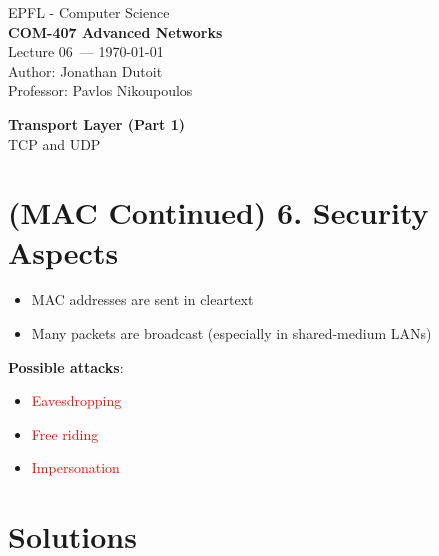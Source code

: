 \documentclass[11pt]{article}
\newcommand{\coursename}{COM-407 Advanced Networks}
\newcommand{\lecturenum}{06}
\newcommand{\lecturedate}{\today}
\newcommand{\professor}{Pavlos Nikoupoulos}
\begin{document}
\begin{center}
  {\large EPFL - Computer Science} \\[0.5em]
  {\Large \textbf{\coursename}} \\[0.5em]
  {\large Lecture \lecturenum\ --- \lecturedate} \\[0.5em]
  {\large Author: Jonathan Dutoit} \\[0.5em]
  {\large Professor: \professor} \\[0.5em]
\end{center}

\vspace{2cm}

\begin{center}
  {\LARGE \textbf{Transport Layer (Part 1)}} \\
  TCP and UDP
\end{center}

\vspace{1cm}

\section*{(MAC Continued) 6. Security Aspects}
\begin{itemize}
	\item MAC addresses are sent in cleartext
	\item Many packets are broadcast (especially in shared-medium LANs)
\end{itemize}

\textbf{Possible attacks}: 
\begin{itemize}
	\item \textcolor{red}{Eavesdropping}
	\item \textcolor{red}{Free riding}
	\item \textcolor{red}{Impersonation}
\end{itemize}

\section*{Solutions}
\end{document}
